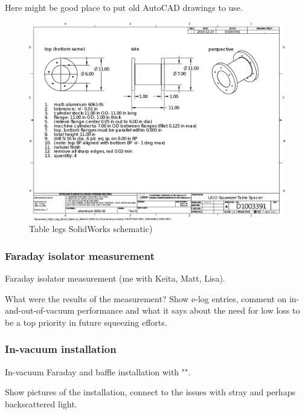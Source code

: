 		Here might be good place to put old AutoCAD drawings to use.
\begin{figure}
\begin{center}
\includegraphics[width=0.6\paperwidth]{Squeezer_High_Leg_Spool_Spacer_2010-12-23_aluminum.eps}
\caption{Table legs SolidWorks schematic)
}
\end{center}
\end{figure}


            \subsubsection{Faraday isolator measurement}
            \label{Faraday}

                Faraday isolator measurement (me with Keita, Matt, Lisa).

		What were the results of the measurement? Show e-log entries, comment on in-and-out-of-vacuum performance and what it says about the need for low loss to be a top priority in future squeezing efforts.

            \subsubsection{In-vacuum installation}
            \label{In-vacuum}

                In-vacuum Faraday and baffle installation with "".

                Show pictures of the installation, connect to the issues with stray and perhaps backscattered light.

